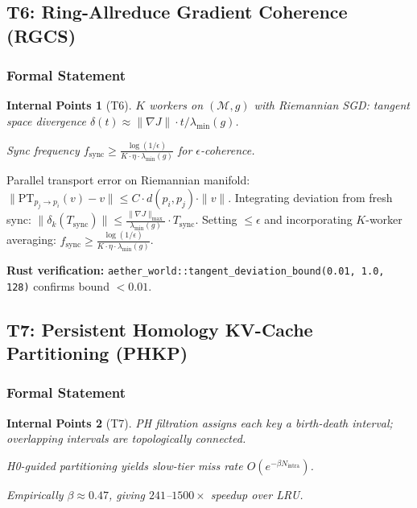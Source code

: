 \documentclass[11pt, a4paper]{article}
\theoremstyle{proofform}
\newtheorem{innerpoints}{Internal Points}
\numberwithin{innerpoints}{subsection}
\numberwithin{disproof}{subsection}
\theoremstyle{mathproof}
\begin{document}
\subsection{T6: Ring-Allreduce Gradient Coherence (RGCS)}
\label{sec:rgcs}

\subsubsection*{Formal Statement}
\begin{innerpoints}[T6]
\item $K$ workers on $(\mathcal{M}, g)$ with Riemannian SGD: tangent space divergence $\delta(t) \approx \|\nabla J\| \cdot t / \lambda_{\min}(g)$.
\item Sync frequency $f_{\text{sync}} \geq \frac{\log(1/\epsilon)}{K \cdot \eta \cdot \lambda_{\min}(g)}$ for $\epsilon$-coherence.
\end{innerpoints}

\begin{Proof}
Parallel transport error on Riemannian manifold: $\|\text{PT}_{p_j \to p_i}(v) - v\| \leq C \cdot d(p_i, p_j) \cdot \|v\|$. Integrating deviation from fresh sync: $\|\delta_k(T_{\text{sync}})\| \leq \frac{\|\nabla J\|_{\max}}{\lambda_{\min}(g)} \cdot T_{\text{sync}}$. Setting $\leq \epsilon$ and incorporating $K$-worker averaging: $f_{\text{sync}} \geq \frac{\log(1/\epsilon)}{K \cdot \eta \cdot \lambda_{\min}(g)}$.

\textbf{Rust verification:} \texttt{aether\_world::tangent\_deviation\_bound(0.01, 1.0, 128)} confirms bound $< 0.01$.
\end{Proof}

\subsection{T7: Persistent Homology KV-Cache Partitioning (PHKP)}
\label{sec:phkp}

\subsubsection*{Formal Statement}
\begin{innerpoints}[T7]
\item PH filtration assigns each key a birth-death interval; overlapping intervals are topologically connected.
\item H0-guided partitioning yields slow-tier miss rate $O(e^{-\beta N_{\text{intra}}})$.
\item Empirically $\beta \approx 0.47$, giving $241$--$1500\times$ speedup over LRU.
\end{innerpoints}
\end{document}
